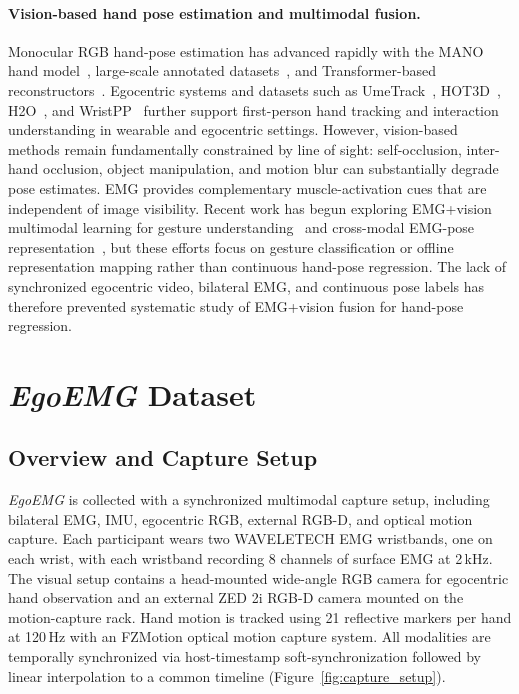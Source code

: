 \documentclass{article}
\newcommand{\dataset}{\textit{EgoEMG}}
\begin{document}
\paragraph{Vision-based hand pose estimation and multimodal fusion.}
Monocular RGB hand-pose estimation has advanced rapidly with the MANO hand model~\citep{mano}, large-scale annotated datasets~\citep{freihand,dexycb,interhand,gigahand}, and Transformer-based reconstructors~\citep{hamer,wilor}. Egocentric systems and datasets such as UmeTrack~\citep{umetrack}, HOT3D~\citep{hot3d}, H2O~\citep{h2o}, and WristPP~\citep{xi2026wristpp} further support first-person hand tracking and interaction understanding in wearable and egocentric settings. However, vision-based methods remain fundamentally constrained by line of sight: self-occlusion, inter-hand occlusion, object manipulation, and motion blur can substantially degrade pose estimates. EMG provides complementary muscle-activation cues that are independent of image visibility. Recent work has begun exploring EMG+vision multimodal learning for gesture understanding~\citep{hao2024multimodal,zandigohar2024multimodal,embridge} and cross-modal EMG-pose representation~\citep{cpep,liu2025frompose}, but these efforts focus on gesture classification or offline representation mapping rather than continuous hand-pose regression. The lack of synchronized egocentric video, bilateral EMG, and continuous pose labels has therefore prevented systematic study of EMG+vision fusion for hand-pose regression.

\section{\dataset{} Dataset}
\label{sec:dataset}

\subsection{Overview and Capture Setup}

\dataset{} is collected with a synchronized multimodal capture setup, including
bilateral EMG, IMU, egocentric RGB, external RGB-D, and optical motion capture.
Each participant wears two WAVELETECH EMG wristbands, one on each wrist, with each
wristband recording 8 channels of surface EMG at 2\,kHz. The visual setup
contains a head-mounted wide-angle RGB camera for egocentric hand observation
and an external ZED 2i RGB-D camera mounted on the motion-capture rack. Hand
motion is tracked using 21 reflective markers per hand at 120\,Hz with an FZMotion optical motion capture system. All modalities
are temporally synchronized via host-timestamp soft-synchronization
followed by linear interpolation to a common timeline (Figure~\ref{fig:capture_setup}).
\end{document}
